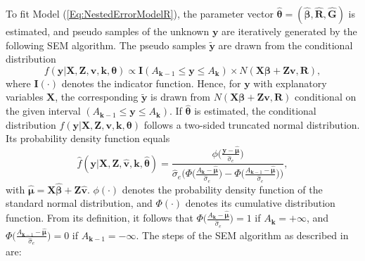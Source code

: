 To fit  Model (\ref{Eq:NestedErrorModelR}), the parameter vector \(\boldsymbol{\hat{\theta}}=\left(\boldsymbol{\widehat{\beta}},\mathbf{\widehat{R}},\mathbf{\widehat{G}}\right)\) is estimated, and pseudo samples of the unknown \(\mathbf{y}\) are iteratively generated by the following SEM algorithm. The pseudo samples \(\mathbf{\tilde{y}}\) are drawn from the conditional distribution 
\begin{equation*}
f\left(\mathbf{y}|\mathbf{X}, \mathbf{Z}, \mathbf{v},\mathbf{k} ,\boldsymbol{\theta}\right) \propto \textbf{I}\left(A_{\mathbf{k}-1} \leq \mathbf{y} \leq A_{\mathbf{k}}\right) \times N\left(\mathbf{X}\boldsymbol{\beta}+\mathbf{Z}\mathbf{v}, \mathbf{R}\right),
\end{equation*}
where \(\textbf{I}\left(\cdot\right)\) denotes the indicator function. Hence, for \(\mathbf{y}\) with explanatory variables \(\mathbf{X}\), the corresponding \(\mathbf{\tilde{y}}\) is drawn from \(N\left(\mathbf{X}\boldsymbol{\beta}+\mathbf{Z}\mathbf{v}, \mathbf{R}\right)\) conditional on the given interval \(\left(A_{\mathbf{k}-1} \leq \mathbf{y} \leq A_{\mathbf{k}}\right)\). If \(\boldsymbol{\hat{\theta}}\) is estimated, the conditional distribution \(f\left(\mathbf{y}|\mathbf{X}, \mathbf{Z}, \mathbf{v},\mathbf{k} ,\boldsymbol{\theta}\right)\) follows a two-sided truncated normal distribution. Its probability density function equals
\begin{equation}
\label{Eq:TwoTruncR}
\hat{f}\left(\mathbf{y}|\mathbf{X}, \mathbf{Z}, \mathbf{\hat{v}}, \mathbf{k}, \boldsymbol{\hat{\theta}}\right)=\frac{\phi\Big(\frac{\mathbf{y}-\boldsymbol{\hat{\mu}}}{\hat{\sigma}_{e}}\Big)}{\hat{\sigma}_{e}\bigg(\Phi \Big(\frac{A_{\mathbf{k}}-\boldsymbol{\hat{\mu}}}{\hat{\sigma}_{e}}\Big)-\Phi \Big(\frac{A_{\mathbf{k}-1}-\boldsymbol{\hat{\mu}}}{\hat{\sigma}_{e}}\Big)\bigg)},
\end{equation}
with \(\boldsymbol{\hat{\mu}} = \mathbf{X}\widehat{\boldsymbol{\beta}}+\mathbf{Z}\mathbf{\hat{v}}\).  \(\phi\left(\cdot\right)\) denotes the probability density function of the standard normal distribution, and \(\Phi(\cdot)\) denotes its cumulative distribution function. From its definition, it follows that \(\Phi \Big(\frac{A_{\mathbf{k}}-\boldsymbol{\hat{\mu}}}{\hat{\sigma}_{e}}\Big) = 1\) if \(A_{\mathbf{k}}=+\infty \), and \(\Phi \Big(\frac{A_{\mathbf{k}-1}-\boldsymbol{\hat{\mu}}}{\hat{\sigma}_{e}}\Big)=0\) if \(A_{\mathbf{k}-1}=-\infty\). The steps of the SEM algorithm as described in \citet{Wal19} are:
